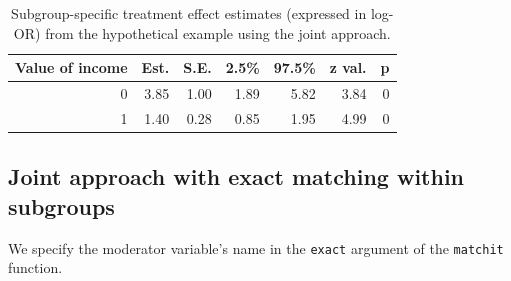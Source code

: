 \documentclass[
  letterpaper,
  DIV=11,
  numbers=noendperiod]{scrreprt}
\begin{document}
\hypertarget{tbl-joint-approach}{}
\begin{table}[!h]
\caption{\label{tbl-joint-approach}Subgroup-specific treatment effect estimates (expressed in log-OR) from
the hypothetical example using the joint approach. }\tabularnewline

\centering
\begin{tabular}{r|r|r|r|r|r|r}
\hline
Value of income & Est. & S.E. & 2.5\% & 97.5\% & z val. & p\\
\hline
0 & 3.85 & 1.00 & 1.89 & 5.82 & 3.84 & 0\\
\hline
1 & 1.40 & 0.28 & 0.85 & 1.95 & 4.99 & 0\\
\hline
\end{tabular}
\end{table}

\hypertarget{joint-approach-with-exact-matching-within-subgroups}{%
\subsection{Joint approach with exact matching within
subgroups}\label{joint-approach-with-exact-matching-within-subgroups}}

We specify the moderator variable's name in the \texttt{exact} argument
of the \texttt{matchit} function.
\end{document}
